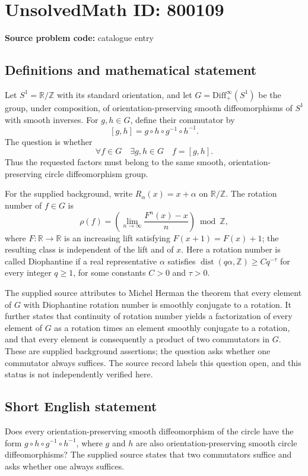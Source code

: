 \documentclass[11pt]{article}
\newcommand{\Z}{\mathbb{Z}}
\newcommand{\R}{\mathbb{R}}
\begin{document}
\section*{UnsolvedMath ID: 800109}
\textbf{Source problem code:} catalogue entry
\subsection{Definitions and mathematical statement}
Let \(S^1=\R/\Z\) with its standard orientation, and let \(G=\mathrm{Diff}_+^\infty(S^1)\) be the group, under composition, of orientation-preserving smooth diffeomorphisms of \(S^1\) with smooth inverses. For \(g,h\in G\), define their commutator by
\[
[g,h]=g\circ h\circ g^{-1}\circ h^{-1}.
\]
The question is whether
\[
\forall f\in G\quad \exists g,h\in G\quad f=[g,h].
\]
Thus the requested factors must belong to the same smooth, orientation-preserving circle diffeomorphism group.

For the supplied background, write \(R_\alpha(x)=x+\alpha\) on \(\R/\Z\). The rotation number of \(f\in G\) is
\[
\rho(f)=\left(\lim_{n\to\infty}\frac{F^n(x)-x}{n}\right)\bmod\Z,
\]
where \(F:\R\to\R\) is an increasing lift satisfying \(F(x+1)=F(x)+1\); the resulting class is independent of the lift and of \(x\). Here a rotation number is called Diophantine if a real representative \(\alpha\) satisfies \(\operatorname{dist}(q\alpha,\Z)\geq Cq^{-\tau}\) for every integer \(q\geq1\), for some constants \(C>0\) and \(\tau>0\).

The supplied source attributes to Michel Herman the theorem that every element of \(G\) with Diophantine rotation number is smoothly conjugate to a rotation. It further states that continuity of rotation number yields a factorization of every element of \(G\) as a rotation times an element smoothly conjugate to a rotation, and that every element is consequently a product of two commutators in \(G\). These are supplied background assertions; the question asks whether one commutator always suffices. The source record labels this question open, and this status is not independently verified here.
\subsection{Short English statement}
Does every orientation-preserving smooth diffeomorphism of the circle have the form \(g\circ h\circ g^{-1}\circ h^{-1}\), where \(g\) and \(h\) are also orientation-preserving smooth circle diffeomorphisms? The supplied source states that two commutators suffice and asks whether one always suffices.
\end{document}
